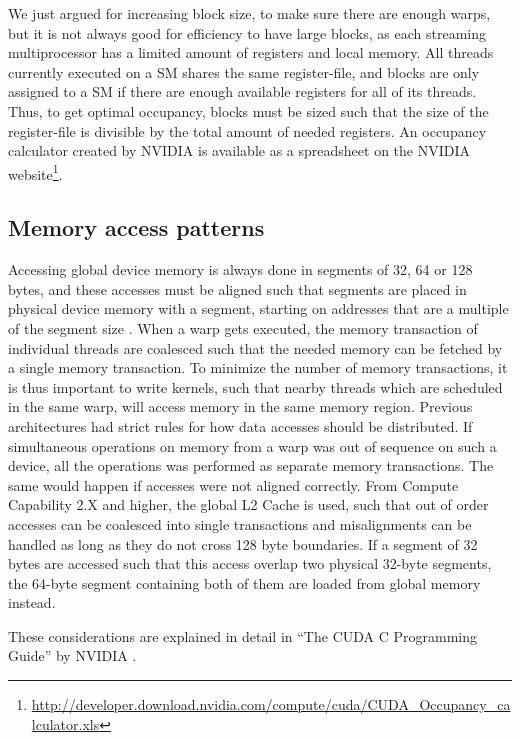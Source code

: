 We just argued for increasing block size, to make sure there are
enough warps, but it is not always good for efficiency to have large
blocks, as each streaming multiprocessor has a limited amount of
registers and local memory. All threads currently executed on a SM
shares the same register-file, and blocks are only assigned to a SM if
there are enough available registers for all of its threads. Thus, to
get optimal occupancy, blocks must be sized such that the size of the
register-file is divisible by the total amount of needed registers. An
occupancy calculator created by NVIDIA is available as a spreadsheet
on the NVIDIA
website\footnote{\url{http://developer.download.nvidia.com/compute/cuda/CUDA_Occupancy_calculator.xls}}.

\subsection{Memory access patterns}
Accessing global device memory is always done in segments of 32, 64 or
128 bytes, and these accesses must be aligned such that segments are
placed in physical device memory with a segment, starting on addresses
that are a multiple of the segment size
\cite{nvidia2012cudaguide}. When a warp gets executed, the memory
transaction of individual threads are coalesced such that the needed
memory can be fetched by a single memory transaction. To minimize the
number of memory transactions, it is thus important to write kernels,
such that nearby threads which are scheduled in the same warp, will
access memory in the same memory region. Previous architectures had
strict rules for how data accesses should be distributed. If
simultaneous operations on memory from a warp was out of sequence on
such a device, all the operations was performed as separate memory
transactions. The same would happen if accesses were not aligned
correctly. From Compute Capability 2.X and higher, the global L2 Cache
is used, such that out of order accesses can be coalesced into single
transactions and misalignments can be handled as long as they do not
cross 128 byte boundaries. If a segment of 32 bytes are accessed such
that this access overlap two physical 32-byte segments, the 64-byte
segment containing both of them are loaded from global memory instead.

These considerations are explained in detail in ``The CUDA C
Programming Guide'' by NVIDIA \cite[Section~5.3.2]{nvidia2012cudaguide}.

